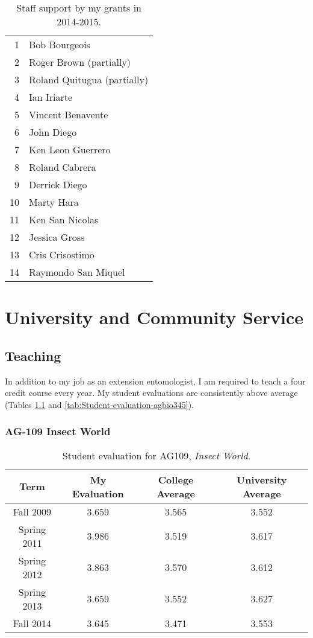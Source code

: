 \documentclass[12pt,oneside,english]{scrbook}
\begin{document}
\begin{table}[h]
\begin{longtable}{r>{\raggedright}p{5cm}}
\caption{\label{tab:Staff-support-by-my-grants}Staff support by my grants in 2014-2015.}
\tabularnewline
\endfirsthead
\midrule 
1 &
 Bob Bourgeois\tabularnewline
2 &
 Roger Brown (partially)\tabularnewline
3 &
 Roland Quitugua (partially)\tabularnewline
4 &
 Ian Iriarte\tabularnewline
5 &
 Vincent Benavente\tabularnewline
6 &
 John Diego\tabularnewline
7 &
 Ken Leon Guerrero\tabularnewline
8 &
 Roland Cabrera\tabularnewline
9 &
 Derrick Diego\tabularnewline
10 &
 Marty Hara\tabularnewline
11 &
 Ken San Nicolas\tabularnewline
12 &
 Jessica Gross\tabularnewline
13 &
Cris Crisostimo\tabularnewline
14 &
Raymondo San Miquel\tabularnewline
\bottomrule
\end{longtable}
\end{table}

\chapter{University and Community Service}

\section{Teaching }

In addition to my job as an extension entomologist, I am required to teach a four credit course every year. My student evaluations are consistently above average (Tables \ref{tab:Student-evaluation-ag109} and \ref{tab:Student-evaluation-agbio345}).

\subsection{AG-109 Insect World}

\begin{table}[h]
\protect\caption{\label{tab:Student-evaluation-ag109}Student evaluation for AG109, \emph{Insect World}.}
\centering{}%
\begin{tabular}{cccc}
\hline 
Term & My Evaluation & College Average & University Average\tabularnewline
\hline 
Fall 2009   & 3.659 & 3.565 & 3.552\tabularnewline
Spring 2011 & 3.986 & 3.519 & 3.617\tabularnewline
Spring 2012 & 3.863 & 3.570 & 3.612\tabularnewline
Spring 2013 & 3.659 & 3.552 & 3.627\tabularnewline
Fall 2014 	& 3.645 & 3.471 & 3.553\tabularnewline   
\hline 
\end{tabular}
\end{table}
\end{document}
